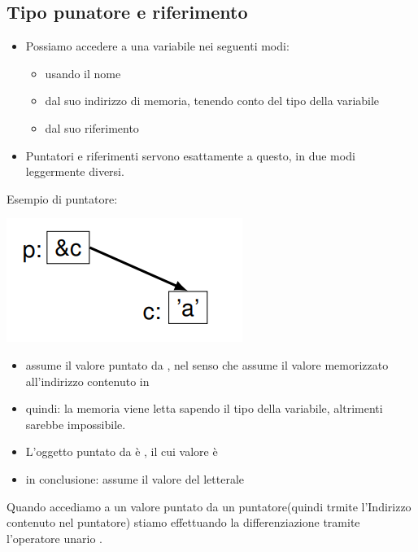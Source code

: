\subsection{Tipo punatore e riferimento}
\begin{itemize}
    \item Possiamo accedere a una variabile nei seguenti modi:
    \begin{itemize}
        \item usando il nome
        \item dal suo indirizzo di memoria, tenendo conto del tipo della
        variabile
        \item dal suo riferimento
    \end{itemize}
    \item Puntatori e riferimenti servono esattamente a questo, in
    due modi leggermente diversi.
\end{itemize}
 Esempio di puntatore:
 
 \begin{center}
     \includegraphics[scale = 0.6]{Capitoli/Tipi di dato/Esempi/ptr.png}
 \end{center}
 \begin{itemize}
     \item {} assume il valore puntato da , nel senso che  assume il valore memorizzato all’indirizzo contenuto in 
    \item quindi: la memoria viene letta sapendo il tipo della
    variabile, altrimenti sarebbe impossibile.
    \item L’oggetto puntato da  è , il cui valore è 
    \item in conclusione:  assume il valore del letterale 
 \end{itemize}
Quando accediamo a un valore puntato da un puntatore(quindi trmite l'Indirizzo contenuto nel puntatore) stiamo effettuando la differenziazione tramite l'operatore unario \textcolor{blue}{\code{*}}.\newline\newline
